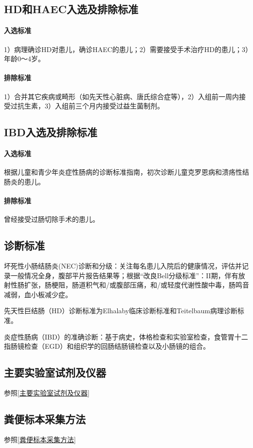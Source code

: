     \subsection{HD和HAEC入选及排除标准}
      \paragraph{入选标准} 1）病理确诊HD对患儿，确诊HAEC的患儿；2）需要接受手术治疗HD的患儿；3）年龄0～4岁。
      \paragraph{排除标准} 1）合并其它疾病或畸形（如先天性心脏病、唐氏综合症等），2）入组前一周内接受过抗生素，3）入组前三个月内接受过益生菌制剂。
    \subsection{IBD入选及排除标准}
      \paragraph{入选标准} 根据儿童和青少年炎症性肠病的诊断标准指南\cite{levine2014espghan}，初次诊断儿童克罗恩病和溃疡性结肠炎的患儿。
      \paragraph{排除标准} 曾经接受过肠切除手术的患儿。
  \subsection{诊断标准}
    坏死性小肠结肠炎(NEC)诊断和分级：关注每名患儿入院后的健康情况，评估并记录一般情况全身，腹部平片报告结果等；根据“改良Bell分级标准”\cite{bell1978neonatal}：II期，伴有放射性肠扩张，肠梗阻，肠道积气和/或腹部压痛，和/或轻度代谢性酸中毒，肠鸣音减弱，血小板减少症。

    先天性巨结肠（HD）诊断标准为Elhalaby临床诊断标准\cite{elhalaby1995enterocolitis}和Teitelbaum病理诊断标准。

    炎症性肠病（IBD）的准确诊断：基于病史，体格检查和实验室检查，食管胃十二指肠镜检查（EGD）和组织学的回肠结肠镜检查以及小肠镜的组合。



  \subsection{主要实验室试剂及仪器}
  参照\ref{主要实验室试剂及仪器}
  \subsection{粪便标本采集方法}
  参照\ref{粪便标本采集方法}
